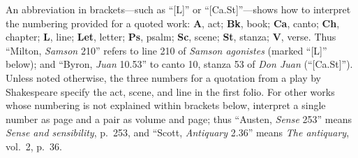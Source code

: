 An abbreviation in brackets---such as ``[L]'' or ``[Ca.St]''---shows how to interpret the numbering provided for a quoted work: \textbf{A}, act; \textbf{Bk}, book; \textbf{Ca}, canto; \textbf{Ch}, chapter; \textbf{L}, line; \textbf{Let}, letter; \textbf{Ps}, psalm; \textbf{Sc}, scene; \textbf{St}, stanza; \textbf{V}, verse. %
Thus ``Milton, \textit{Samson} 210'' refers to line 210 of \textit{Samson agonistes} (marked ``[L]'' below); and ``Byron, \textit{Juan} 10.53'' to canto 10, stanza 53 of \textit{Don Juan} (``[Ca.St]''). Unless noted otherwise, %
the three numbers for a quotation from a play by Shakespeare specify the act, scene, and line in the first folio. For other works whose numbering is not explained within brackets below, interpret a single number as page and a pair as volume and page; thus ``Austen, \textit{Sense} 253'' means \textit{Sense and sensibility}, p.~253, and ``Scott, \textit{Antiquary} 2.36'' means \textit{The antiquary}, vol.~2, p.~36.

